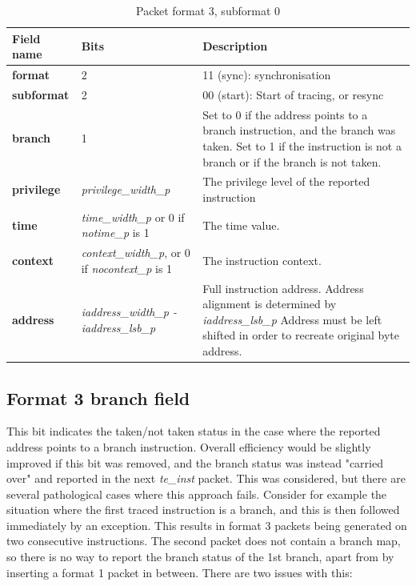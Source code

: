 \begin{table}[htp]
  \centering
  \caption{Packet format 3, subformat 0}
  \label{tab:te_inst3-0}
  \begin{tabulary}{\textwidth}{|l|p{35mm}|p{90mm}|}
    \hline
    {\bf Field name} & {\bf Bits} & {\bf Description} \\
    \hline
    \textbf{format} & 2 & 11 (sync): synchronisation\\
    \hline
    \textbf{subformat} & 2 & 00 (start): Start of tracing, or resync \\
    \hline
    \textbf{branch} & 1 & Set to 0 if the address points to a branch instruction, and the branch was taken.  
              Set to 1 if the instruction is not a branch or if the branch is not taken. \\
    \hline
    \textbf{privilege} & \textit {privilege\_width\_p} & 
                The privilege level of the reported instruction\\
    \hline
    \textbf{time} &  \textit {time\_width\_p} or 0 if \textit {notime\_p} is 1 & 
               The time value.\\
    \hline
    \textbf{context} &  \textit {context\_width\_p}, 
               or 0 if \textit {nocontext\_p} is 1 & 
               The instruction context. \\
    \hline
    \textbf{address} & \textit {iaddress\_width\_p - iaddress\_lsb\_p} & 
              Full instruction address.  Address alignment is determined by \textit {iaddress\_lsb\_p} Address must be left shifted in order to recreate original byte address. \\
    \hline
  \end{tabulary}
\end{table}

\subsection{Format 3 \textbf{branch} field}

This bit indicates the taken/not taken status in the case where the reported address points to a branch instruction.
Overall efficiency would be slightly improved if this bit was removed, and the branch status was instead 
"carried over" and reported in the next \textit{te\_inst} packet.  This was considered, but there are several
pathological cases where this approach fails.  Consider for example the situation where the first traced instruction
is a branch, and this is then followed immediately by an exception.  This results in format 3 packets being generated 
on two consecutive instructions.  The second packet does not contain a branch
map, so there is no way to report the branch status of the 1st branch, apart from by inserting a format 1 packet in 
between.  There are two issues with this:

